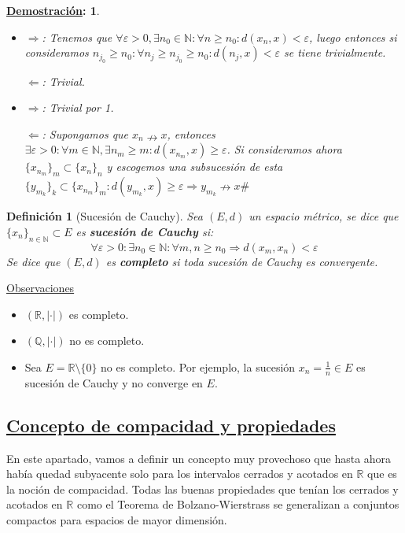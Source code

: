 \documentclass[10pt,a4paper,openright]{book}
\theoremstyle{break}
\newtheorem*{defi}{Definición}
\newtheorem*{demo}{\underline{Demostración}:}
\begin{document}
\begin{demo}
\begin{itemize}
\item $\Rightarrow$: Tenemos que $\forall \varepsilon > 0, \exists n_0 \in \mathbb{N} : \forall n \geq n_0 : d(x_n,x) < \varepsilon$, luego entonces si consideramos $n_{j_0} \geq n_0 : \forall n_j \geq n_{j_0} \geq n_0 : d(n_{j}, x) < \varepsilon$ se tiene trivialmente.

$\Leftarrow$: Trivial.

\item  $\Rightarrow$: Trivial por 1.

$\Leftarrow$: Supongamos que $x_n  \nrightarrow x$, entonces $\exists \varepsilon > 0 : \forall m \in \mathbb{N}, \exists n_m \geq m : d(x_{n_m}, x) \geq \varepsilon$. Si consideramos ahora $\{x_{n_m}\}_m \subset \{x_n\}_n$ y escogemos una subsucesión de esta $\{y_{m_k}\}_k \subset \{x_{n_m}\}_m : d(y_{m_k}, x) \geq \varepsilon\Rightarrow y_{m_k} \nrightarrow x \#$
\end{itemize}
\end{demo}

\begin{defi}[Sucesión de Cauchy]
Sea $(E,d)$ un espacio métrico, se dice que $\{x_n\}_{n\in \mathbb{N}} \subset E$ es \textbf{sucesión de Cauchy} si:
$$\forall \varepsilon > 0: \exists n_0 \in \mathbb{N} : \forall m,n \geq n_0 \Rightarrow d(x_m, x_n) < \varepsilon$$
Se dice que $(E,d)$ es \textbf{completo} si toda sucesión de Cauchy es convergente.
\end{defi}

\newpage

\underline{Observaciones}
\begin{itemize}
\item $(\mathbb{R}, |\cdot|)$ es completo.

\item $(\mathbb{Q}, |\cdot|)$ no es completo.

\item Sea $E = \mathbb{R} \setminus \{0\}$ no es completo. Por ejemplo, la sucesión $x_n = \frac{1}{n} \in E$ es sucesión de Cauchy y no converge en $E$.
\end{itemize}

\subsection*{\underline{Concepto de compacidad y propiedades}}
En este apartado, vamos a definir un concepto muy provechoso que hasta ahora había quedad subyacente solo para los intervalos cerrados y acotados en $\mathbb{R}$ que es la noción de compacidad. Todas las buenas propiedades que tenían los cerrados y acotados en $\mathbb{R}$ como el Teorema de Bolzano-Wierstrass se generalizan a conjuntos compactos para espacios de mayor dimensión.
\end{document}
